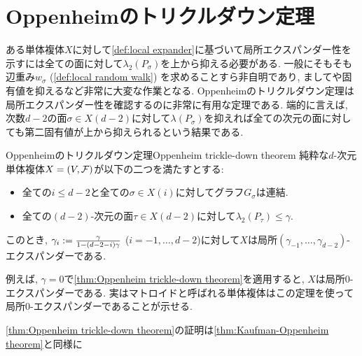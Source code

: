 \section{Oppenheimのトリクルダウン定理}
ある単体複体$X$に対して\cref{def:local expander}に基づいて局所エクスパンダー性を示すには全ての面に対して$\lambda_2(P_\sigma)$を上から抑える必要がある.
一般にそもそも辺重み$w_\sigma$ (\cref{def:local random walk}) を求めることすら非自明であり, ましてや固有値を抑えるなど非常に大変な作業となる.
Oppenheimのトリクルダウン定理は局所エクスパンダー性を確認するのに非常に有用な定理である.
端的に言えば, 次数$d-2$の面$\sigma \in X(d-2)$に対して$\lambda(P_\sigma)$を抑えれば全ての次元の面に対しても第二固有値が上から抑えられるという結果である.
\begin{theorem}{Oppenheimのトリクルダウン定理}{Oppenheim trickle-down theorem}
    純粋な$d$-次元単体複体$X = (V,\mathcal{F})$が以下の二つを満たすとする:
    \begin{itemize}
    \item 全ての$i\le d-2$と全ての$\sigma\in X(i)$に対してグラフ$G_\sigma$は連結.
    \item 全ての$(d-2)$-次元の面$\tau \in X(d-2)$に対して$\lambda_2(P_\tau) \le \gamma$.
    \end{itemize}
    このとき, $\gamma_i \mathrel{:=} \frac{\gamma}{1-(d-2-i)\gamma}$ ($i=-1,\dots,d-2$)に対して$X$は局所$(\gamma_{-1},\dots,\gamma_{d-2})$-エクスパンダーである.
\end{theorem}
例えば, $\gamma=0$で\cref{thm:Oppenheim trickle-down theorem}を適用すると, $X$は局所$0$-エクスパンダーである.
実はマトロイドと呼ばれる単体複体はこの定理を使って局所$0$-エクスパンダーであることが示せる.

\cref{thm:Oppenheim trickle-down theorem}の証明は\cref{thm:Kaufman-Oppenheim theorem}と同様に